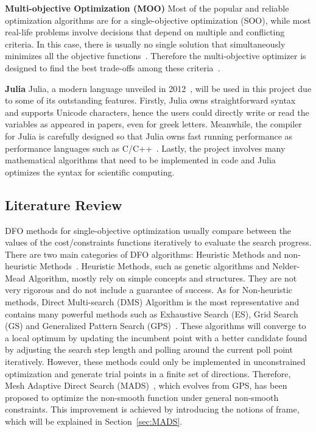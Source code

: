 \documentclass[11pt,oneside,onecolumn,openright]{article}
\begin{document}
  \noindent\textbf{Multi-objective Optimization (MOO) } Most of the popular and reliable optimization algorithms are for a single-objective optimization (SOO), while most real-life problems involve decisions that depend on multiple and conflicting criteria. In this case, there is usually no single solution that simultaneously minimizes all the objective functions~\cite{ryu2009pareto}. Therefore the multi-objective optimizer is designed to find the best trade-offs among these criteria~\cite{audet2008multiobjective}.

  \noindent\textbf{Julia } Julia, a modern language unveiled in 2012~\cite{bezanson2017julia}, will be used in this project due to some of its outstanding features. Firstly, Julia owns straightforward syntax and supports Unicode characters, hence the users could directly write or read the variables as appeared in papers, even for greek letters. Meanwhile, the compiler for Julia is carefully designed so that Julia owns fast running performance as performance languages such as C/C++~\cite{bezanson2018julia}. Lastly, the project involves many mathematical algorithms that need to be implemented in code and Julia optimizes the syntax for scientific computing.

  \subsection{Literature Review}
  DFO methods for single-objective optimization usually compare between the values of the cost/constraints functions iteratively to evaluate the search progress. There are two main categories of DFO algorithms: Heuristic Methods and non-heuristic Methods~\cite{dejemeppe2015derivative,audet2017derivative}. Heuristic Methods, such as genetic algorithms and Nelder-Mead Algorithm, mostly rely on simple concepts and structures. They are not very rigorous and do not include a guarantee of success. As for Non-heuristic methods, Direct Multi-search (DMS) Algorithm is the most representative and contains many powerful methods such as Exhaustive Search (ES), Grid Search (GS) and Generalized Pattern Search (GPS)~\cite{audet2017derivative}. These algorithms will converge to a local optimum by updating the incumbent point with a better candidate found by adjusting the search step length and polling around the current poll point iteratively. However, these methods could only be implemented in unconstrained optimization and generate trial points in a finite set of directions. Therefore, Mesh Adaptive Direct Search (MADS)~\cite{audet2006mesh}, which evolves from GPS, has been proposed to optimize the non-smooth function under general non-smooth constraints. This improvement is achieved by introducing the notions of frame, which will be explained in Section~\ref{sec:MADS}.
\end{document}
